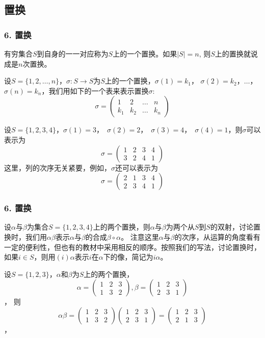 \documentclass{beamer}
\begin{document}
\begin{CJK*}{UTF8}{gbsn}
\section{置换}
\begin{frame}
  \frametitle{6. 置换}
  \begin{Def}
    有穷集合$S$到自身的一一对应称为$S$上的一个\alert{置换}。如果$|S| = n$, 则$S$上的置换就说成是\alert{$n$次置换}。
  \end{Def}
\justifying\let\raggedright\justifying
设$S=\{1,2,\ldots,n\}$，$\sigma:S\to S$为$S$上的一个置换，$\sigma(1) = k_1$， $\sigma(2) = k_2$，$\ldots$，$\sigma(n) = k_n$，我们用如下的一个表来表示置换$\sigma$:
\[\sigma=\begin{pmatrix}1&2&\ldots&n\\k_1&k_2&\ldots&k_n\end{pmatrix}\]
\small{\begin{Ex}
  设$S=\{1,2,3,4\}$，$\sigma(1) = 3$，　$\sigma(2) = 2$，　$\sigma(3) = 4$，　$\sigma(4) = 1$，则$\sigma$可以表示为
  \[\sigma=\begin{pmatrix}1&2&3&4\\3&2&4&1\end{pmatrix}\]
  这里，列的次序无关紧要，例如，$\sigma$还可以表示为
  \[\sigma=\begin{pmatrix}2&1&3&4\\2&3&4&1\end{pmatrix}\]
\end{Ex}}
\end{frame}
\begin{frame}
  \frametitle{6. 置换} 
  \begin{Def}
    设$\alpha$与$\beta$为集合$S=\{1,2,3,4\}$上的两个置换，则$\alpha$与$\beta$为两个从$S$到$S$的双射，讨论置换时，我们用$\alpha\beta$表示$\alpha$与$\beta$的合成$\beta \circ \alpha$。
    注意这里$\alpha$与$\beta$的次序，从运算的角度看有一定的便利性，但也有的教材中采用相反的顺序。按照我们的写法，讨论置换时，如果$i \in S$，则用$(i)\alpha$表示$i$在$\alpha$下的像，简记为$i\alpha$。
  \end{Def}
  \begin{Ex}
    设$S=\{1,2,3\}$，$\alpha$和$\beta$为$S$上的两个置换，
    \[\alpha=\begin{pmatrix}1&2&3\\1&3&2\end{pmatrix},\beta=\begin{pmatrix}1&2&3\\2&3&1\end{pmatrix}\]，
    则
    \[\alpha\beta=\begin{pmatrix}1&2&3\\1&3&2\end{pmatrix}\begin{pmatrix}1&2&3\\2&3&1\end{pmatrix}=\begin{pmatrix}1&2&3\\2&1&3\end{pmatrix}\]，    
  \end{Ex}
 \end{frame}


\end{CJK*}
\end{document}
